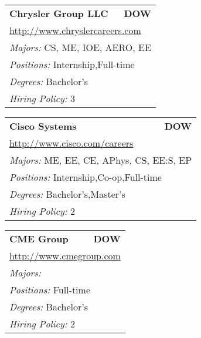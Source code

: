 \documentclass[twoside]{article}
\begin{document}
\begin{center}
\begin{multicols}{3}
\begin{FlushLeft}
\begin{minipage}{.9\columnwidth}
\end{minipage}
 
\begin{minipage}{.9\columnwidth}\begin{tabularx}{.95\columnwidth}{Xr}
                 {\Large\bf Chrysler Group LLC} & {\Large\bf DOW}\\
    \multicolumn{2}{p{.95\columnwidth}}{\url{http://www.chryslercareers.com}}\\
    \multicolumn{2}{p{.95\columnwidth}}{\emph{Majors:} CS, ME, IOE, AERO, EE}\\
    \multicolumn{2}{p{.95\columnwidth}}{\emph{Positions:} Internship,Full-time}\\
    \multicolumn{2}{p{.95\columnwidth}}{\emph{Degrees:} Bachelor's}\\
    \multicolumn{2}{p{.95\columnwidth}}{\emph{Hiring Policy:} 3}\\
    \end{tabularx}
    
\end{minipage}
 
\begin{minipage}{.9\columnwidth}\begin{tabularx}{.95\columnwidth}{Xr}
                 {\Large\bf Cisco Systems} & {\Large\bf DOW}\\
    \multicolumn{2}{p{.95\columnwidth}}{\url{http://www.cisco.com/careers}}\\
    \multicolumn{2}{p{.95\columnwidth}}{\emph{Majors:} ME, EE, CE, APhys, CS, EE:S, EP}\\
    \multicolumn{2}{p{.95\columnwidth}}{\emph{Positions:} Internship,Co-op,Full-time}\\
    \multicolumn{2}{p{.95\columnwidth}}{\emph{Degrees:} Bachelor's,Master's}\\
    \multicolumn{2}{p{.95\columnwidth}}{\emph{Hiring Policy:} 2}\\
    \end{tabularx}
    
\end{minipage}
 
\begin{minipage}{.9\columnwidth}\begin{tabularx}{.95\columnwidth}{Xr}
                 {\Large\bf CME Group} & {\Large\bf DOW}\\
    \multicolumn{2}{p{.95\columnwidth}}{\url{http://www.cmegroup.com}}\\
    \multicolumn{2}{p{.95\columnwidth}}{\emph{Majors:} }\\
    \multicolumn{2}{p{.95\columnwidth}}{\emph{Positions:} Full-time}\\
    \multicolumn{2}{p{.95\columnwidth}}{\emph{Degrees:} Bachelor's}\\
    \multicolumn{2}{p{.95\columnwidth}}{\emph{Hiring Policy:} 2}\\
    \end{tabularx}
    

\end{minipage}
\end{FlushLeft}
\end{multicols}
\end{center}
\end{document}
